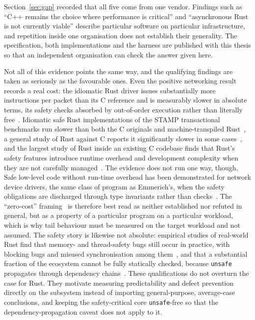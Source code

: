 \documentclass[english,oneside,a4paper,censored,csm,software-track-2020]{HYthesisML}
\begin{document}
\begin{appendices}
Section~\ref{sec:gap} recorded that all five come from one vendor. Findings such as ``C++ remains
the choice where performance is critical'' and ``asynchronous Rust is not currently viable''
describe particular software on particular infrastructure, and repetition inside one organisation
does not establish their generality. The specification, both implementations and the harness are
published with this thesis so that an independent organisation can check the answer given here.

Not all of this evidence points the same way, and the qualifying findings are taken as seriously
as the favourable ones. Even the positive networking result records a real cost: the idiomatic
Rust driver issues substantially more instructions per packet than its C reference and is
measurably slower in absolute terms, its safety checks absorbed by out-of-order execution rather
than literally free~\cite{emmerich2019drivers}. Idiomatic safe Rust implementations of the STAMP
transactional benchmarks run slower than both the C originals and machine-transpiled
Rust~\cite{suchert2023stamp}, a general study of Rust against C reports it significantly slower in
some cases~\cite{okawa2024ruststudy}, and the largest study of Rust inside an existing C codebase
finds that Rust's safety features introduce runtime overhead and development complexity when they
are not carefully managed~\cite{li2026rustlinux}. The evidence does not run one way, though. Safe
low-level code without run-time overhead has been demonstrated for network device drivers, the
same class of program as Emmerich's, when the safety obligations are discharged through type
invariants rather than checks~\cite{pirelli2023safelowlevel}. The ``zero-cost''
framing~\cite{balasubramanian2017rust} is therefore best read as neither established nor refuted
in general, but as a property of a particular program on a particular workload, which is why tail
behaviour must be measured on the target workload and not assumed. The safety story is likewise
not absolute: empirical studies of real-world Rust find that memory- and thread-safety bugs still
occur in practice, with blocking bugs and misused synchronisation among
them~\cite{qin2020rust,qin2024safety}, and that a substantial fraction of the ecosystem cannot be
fully statically checked, because \texttt{unsafe} propagates through dependency
chains~\cite{evans2020rust}. These qualifications do not overturn the case for Rust. They motivate
measuring predictability and defect prevention directly on the subsystem instead of importing
general-purpose, average-case conclusions, and keeping the safety-critical core
\texttt{unsafe}-free so that the dependency-propagation caveat does not apply to it.


\end{appendices}
\end{document}
